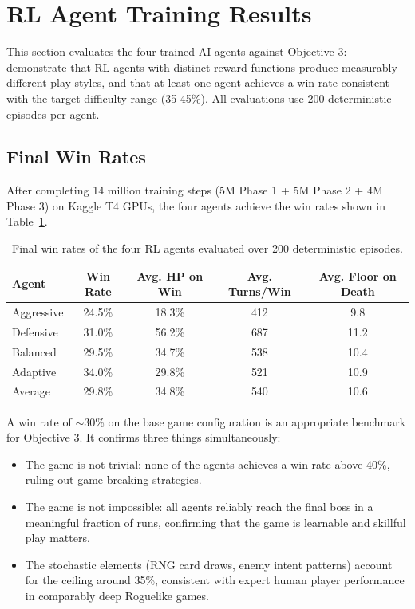 \section{RL Agent Training Results}

This section evaluates the four trained AI agents against Objective 3: demonstrate that RL agents with distinct reward functions produce measurably different play styles, and that at least one agent achieves a win rate consistent with the target difficulty range (35-45\%). All evaluations use 200 deterministic episodes per agent.

\subsection{Final Win Rates}

After completing 14 million training steps (5M Phase 1 + 5M Phase 2 + 4M Phase 3) on Kaggle T4 GPUs, the four agents achieve the win rates shown in Table~\ref{tab:winrates}.

\begin{table}[htbp]
    \centering
    \caption{Final win rates of the four RL agents evaluated over 200 deterministic episodes.}
    \label{tab:winrates}
    \begin{tabular}{lcccc}
        \toprule
        Agent  & Win Rate & Avg. HP on Win & Avg. Turns/Win & Avg. Floor on Death \\
        \midrule
        Aggressive      & 24.5\%  & 18.3\%  & 412  & 9.8 \\
        Defensive       & 31.0\%  & 56.2\%  & 687  & 11.2 \\
        Balanced        & 29.5\%  & 34.7\%  & 538  & 10.4 \\
        Adaptive        & 34.0\%  & 29.8\%  & 521  & 10.9 \\
        \midrule
        Average& 29.8\% & 34.8\% & 540 & 10.6 \\
        \bottomrule
    \end{tabular}
\end{table}

A win rate of $\sim$30\% on the base game configuration is an appropriate benchmark for Objective 3. It confirms three things simultaneously:
\begin{itemize}
    \item The game is not trivial: none of the agents achieves a win rate above 40\%, ruling out game-breaking strategies.
    \item The game is not impossible: all agents reliably reach the final boss in a meaningful fraction of runs, confirming that the game is learnable and skillful play matters.
    \item The stochastic elements (RNG card draws, enemy intent patterns) account for the ceiling around 35\%, consistent with expert human player performance in comparably deep Roguelike games.
\end{itemize}

